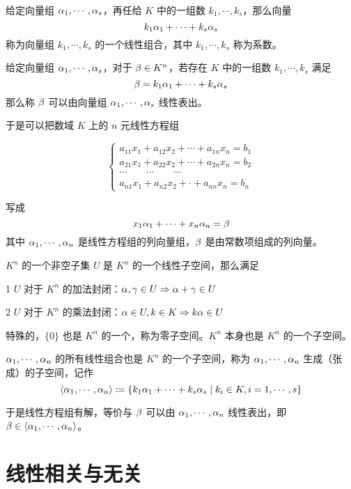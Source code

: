 \begin{definition}[线性组合]
	给定向量组 $\alpha_1,\cdots,\alpha_s$，再任给 $K$ 中的一组数 $k_1,\cdots,k_s$，那么向量
	\[k_1 \alpha_1+\cdots+k_s \alpha_s\]
	称为向量组 $k_1,\cdots,k_s$ 的一个线性组合，其中 $k_1,\cdots,k_s$ 称为系数。
\end{definition}

\begin{definition}[线性表出]
	给定向量组 $\alpha_1,\cdots,\alpha_s$，对于 $\beta \in K^n$，若存在 $K$ 中的一组数 $k_1,\cdots,k_s$ 满足
	\[\beta = k_1\alpha_1+\cdots+k_s\alpha_s\]
	那么称 $\beta$ 可以由向量组 $\alpha_1,\cdots,\alpha_s$ 线性表出。
\end{definition}

于是可以把数域 $K$ 上的 $n$ 元线性方程组

\begin{equation*}
	\left\{
		\begin{matrix}
			a_{11}x_1+a_{12}x_2+\cdots+a_{1n}x_n=b_1\\
			a_{21}x_1+a_{22}x_2+\cdots+a_{2n}x_n=b_2\\
			\cdots\qquad\cdots\qquad\cdots\\
			a_{n1}x_1+a_{n2}x_2+\cdot +a_{nn}x_n=b_n
		\end{matrix}
	\right.
\end{equation*}

写成
\[x_1\alpha_1+\cdots+x_n\alpha_n=\beta\]
其中 $\alpha_1,\cdots,\alpha_n$ 是线性方程组的列向量组，$\beta$ 是由常数项组成的列向量。

\begin{definition}[线性子空间]
	$K^n$ 的一个非空子集 $U$ 是 $K^n$ 的一个线性子空间，那么满足
	
	\num{1} $U$ 对于 $K^n$ 的加法封闭：$\alpha,\gamma\in U \Rightarrow \alpha+\gamma \in U$

	\num{2} $U$ 对于 $K^n$ 的乘法封闭：$\alpha \in U,k\in K \Rightarrow k\alpha \in U$
\end{definition}

特殊的，$\{0\}$ 也是 $K^n$ 的一个，称为零子空间。$K^n$ 本身也是 $K^n$ 的一个子空间。

$\alpha_1,\cdots,\alpha_n$ 的所有线性组合也是 $K^n$ 的一个子空间，称为 $\alpha_1,\cdots,\alpha_n$ 生成（张成）的子空间，记作
\[\langle \alpha_1,\cdots,\alpha_n\rangle\coloneqq \{k_1\alpha_1+\cdots+k_s\alpha_s \mid k_i\in K,i=1,\cdots,s\}\]

于是线性方程组有解，等价与 $\beta$ 可以由 $\alpha_1,\cdots,\alpha_n$ 线性表出，即 $\beta \in \langle\alpha_1,\cdots,\alpha_n\rangle$。

\section{线性相关与无关}

